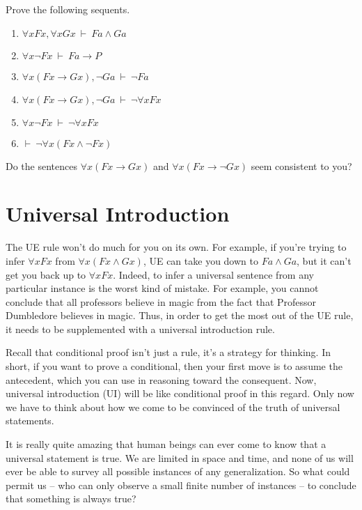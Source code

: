 \begin{exercises} Prove the following sequents.
\begin{enumerate}
\item $\forall xFx,\forall xGx\:\vdash\: Fa\wedge Ga$
\item $\forall x\neg Fx\:\vdash\: Fa\to P$
\item $\forall x(Fx\to Gx),\neg Ga\:\vdash\:\neg Fa$
\item $\forall x(Fx\to Gx),\neg Ga\:\vdash\:\neg \forall xFx$  
\item $\forall x\neg Fx\:\vdash\:\neg\forall xFx$
\item $\vdash\:\neg\forall x(Fx\wedge\neg Fx)$
\end{enumerate}
\end{exercises}

\begin{exercise} Do the sentences $\forall x(Fx\to Gx)$ and
  $\forall x(Fx\to \neg Gx)$ seem consistent to you? \end{exercise}



\section*{Universal Introduction}

The UE rule won't do much for you on its own.  For example, if you're
trying to infer $\forall xFx$ from $\forall x(Fx\wedge Gx)$, UE can
take you down to $Fa\wedge Ga$, but it can't get you back up to
$\forall xFx$.  Indeed, to infer a universal sentence from any
particular instance is the worst kind of mistake.  For example, you
cannot conclude that all professors believe in magic from the fact
that Professor Dumbledore believes in magic.  Thus, in order to get
the most out of the UE rule, it needs to be supplemented with a
universal introduction rule.

Recall that conditional proof isn't just a rule, it's a strategy for
thinking.  In short, if you want to prove a conditional, then your
first move is to assume the antecedent, which you can use in reasoning
toward the consequent.  Now, universal introduction (UI) will be like
conditional proof in this regard.  Only now we have to think about
how we come to be convinced of the truth of universal statements.

It is really quite amazing that human beings can ever come to know
that a universal statement is true.  We are limited in space and time,
and none of us will ever be able to survey all possible instances of
any generalization.  So what could permit us -- who can only observe
a small finite number of instances -- to conclude that something is
always true?

